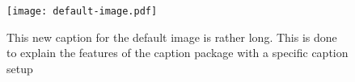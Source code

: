 \usepackage{caption}

\captionsetup{format=plain,indention=1cm}

\begin{figure}
	\texttt{[image: default-image.pdf]}
	\caption{This new caption for the default image is rather long. This is
		done to explain the features of the caption package with a specific
	caption setup}
\end{figure}
